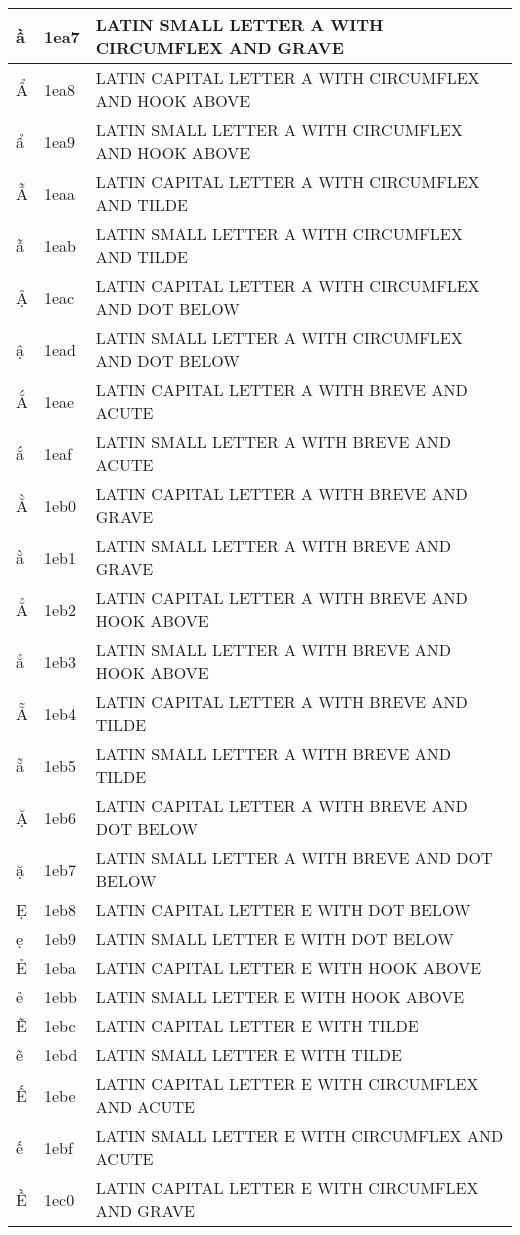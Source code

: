 \documentclass[12pt,letterpaper,openany]{book}
\begin{document}
\begin{center}
\begin{supertabular}{|m{0.25in}|m{0.5in}|m{4in}|}
ầ & 1ea7 & LATIN SMALL LETTER A WITH CIRCUMFLEX AND GRAVE\\\hline
Ẩ & 1ea8 & LATIN CAPITAL LETTER A WITH CIRCUMFLEX AND HOOK ABOVE\\\hline
ẩ & 1ea9 & LATIN SMALL LETTER A WITH CIRCUMFLEX AND HOOK ABOVE\\\hline
Ẫ & 1eaa & LATIN CAPITAL LETTER A WITH CIRCUMFLEX AND TILDE\\\hline
ẫ & 1eab & LATIN SMALL LETTER A WITH CIRCUMFLEX AND TILDE\\\hline
Ậ & 1eac & LATIN CAPITAL LETTER A WITH CIRCUMFLEX AND DOT BELOW\\\hline
ậ & 1ead & LATIN SMALL LETTER A WITH CIRCUMFLEX AND DOT BELOW\\\hline
Ắ & 1eae & LATIN CAPITAL LETTER A WITH BREVE AND ACUTE\\\hline
ắ & 1eaf & LATIN SMALL LETTER A WITH BREVE AND ACUTE\\\hline
Ằ & 1eb0 & LATIN CAPITAL LETTER A WITH BREVE AND GRAVE\\\hline
ằ & 1eb1 & LATIN SMALL LETTER A WITH BREVE AND GRAVE\\\hline
Ẳ & 1eb2 & LATIN CAPITAL LETTER A WITH BREVE AND HOOK ABOVE\\\hline
ẳ & 1eb3 & LATIN SMALL LETTER A WITH BREVE AND HOOK ABOVE\\\hline
Ẵ & 1eb4 & LATIN CAPITAL LETTER A WITH BREVE AND TILDE\\\hline
ẵ & 1eb5 & LATIN SMALL LETTER A WITH BREVE AND TILDE\\\hline
Ặ & 1eb6 & LATIN CAPITAL LETTER A WITH BREVE AND DOT BELOW\\\hline
ặ & 1eb7 & LATIN SMALL LETTER A WITH BREVE AND DOT BELOW\\\hline
Ẹ & 1eb8 & LATIN CAPITAL LETTER E WITH DOT BELOW\\\hline
ẹ & 1eb9 & LATIN SMALL LETTER E WITH DOT BELOW\\\hline
Ẻ & 1eba & LATIN CAPITAL LETTER E WITH HOOK ABOVE\\\hline
ẻ & 1ebb & LATIN SMALL LETTER E WITH HOOK ABOVE\\\hline
Ẽ & 1ebc & LATIN CAPITAL LETTER E WITH TILDE\\\hline
ẽ & 1ebd & LATIN SMALL LETTER E WITH TILDE\\\hline
Ế & 1ebe & LATIN CAPITAL LETTER E WITH CIRCUMFLEX AND ACUTE\\\hline
ế & 1ebf & LATIN SMALL LETTER E WITH CIRCUMFLEX AND ACUTE\\\hline
Ề & 1ec0 & LATIN CAPITAL LETTER E WITH CIRCUMFLEX AND GRAVE\\\hline

\end{supertabular}
\end{center}
\end{document}
